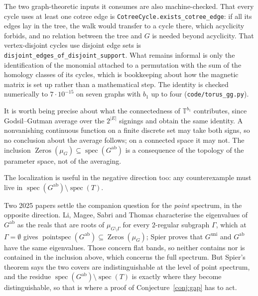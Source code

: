 \documentclass[11pt]{article}
\theoremstyle{remark}
\begin{document}
The two graph-theoretic inputs it consumes are also machine-checked. That every cycle uses at
least one cotree edge is \texttt{CotreeCycle.exists\_cotree\_edge}: if all its edges lay in
the tree, the walk would transfer to a cycle there, which acyclicity forbids, and no relation
between the tree and $G$ is needed beyond acyclicity. That vertex-disjoint cycles use disjoint
edge sets is \texttt{disjoint\_edges\_of\_disjoint\_support}. What remains informal is only
the identification of the monomial attached to a permutation with the sum of the homology
classes of its cycles, which is bookkeeping about how the magnetic matrix is set up rather
than a mathematical step. The
identity is checked numerically to $7\cdot10^{-15}$ on seven graphs with $b_1$ up to four
(\texttt{code/torus\_gg.py}).

It is worth being precise about what the connectedness of $\mathbb T^{b_1}$ contributes,
since Godsil--Gutman average over the $2^{|E|}$ signings and obtain the same identity. A
nonvanishing continuous function on a finite discrete set may take both signs, so no
conclusion about the average follows; on a connected space it may not. The inclusion
$\operatorname{Zeros}(\mu_G)\subseteq\operatorname{spec}(G^{\mathrm{ab}})$ is a consequence of
the topology of the parameter space, not of the averaging.

The localization is useful in the negative direction too: any counterexample must live in
$\operatorname{spec}(G^{\mathrm{ab}})\setminus\operatorname{spec}(T)$.

Two 2025 papers settle the companion question for the \emph{point} spectrum, in the opposite
direction. Li, Magee, Sabri and Thomas \cite{LMST} characterise the eigenvalues of
$G^{\mathrm{ab}}$ as the reals that are roots of $\mu_{G\setminus\Gamma}$ for every
$2$-regular subgraph $\Gamma$, which at $\Gamma=\emptyset$ gives
$\operatorname{pointspec}(G^{\mathrm{ab}})\subseteq\operatorname{Zeros}(\mu_G)$; Spier
\cite{Sp} proves that $G^{\mathrm{uni}}$ and $G^{\mathrm{ab}}$ have the same eigenvalues.
Those concern flat bands, so neither contains nor is contained in the inclusion above, which
concerns the full spectrum. But Spier's theorem says the two covers are indistinguishable at
the level of point spectrum, and the residue
$\operatorname{spec}(G^{\mathrm{ab}})\setminus\operatorname{spec}(T)$ is exactly where they
become distinguishable, so that is where a proof of Conjecture~\ref{conj:gap} has to act.
\end{document}
